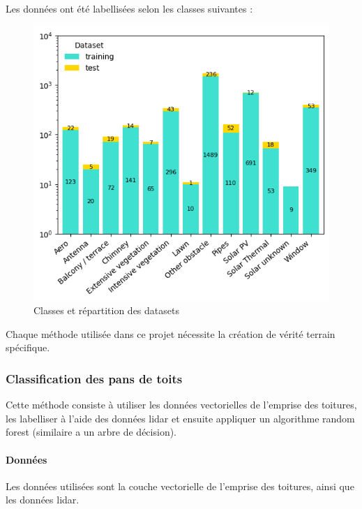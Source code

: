 \par{Les données ont été labellisées selon les classes suivantes :}
\begin{figure}[H]
    \centering
    \includegraphics[width=1\linewidth]{02-main//figures/ch2/stdl_03_classes.png}
    \caption{Classes et répartition des datasets}
    \label{fig:stdl_03_classes}
\end{figure}
\par{Chaque méthode utilisée dans ce projet nécessite la création de vérité terrain spécifique.}

\subsubsection{Classification des pans de toits}
\par{Cette méthode consiste à utiliser les données vectorielles de l'emprise des toitures, les labelliser à l'aide des données \gls{lidar} et ensuite appliquer un algorithme random forest (similaire a un arbre de décision).}

\paragraph{Données}
\par{Les données utilisées sont la couche vectorielle de l'emprise des toitures, ainsi que les données \gls{lidar}.}

